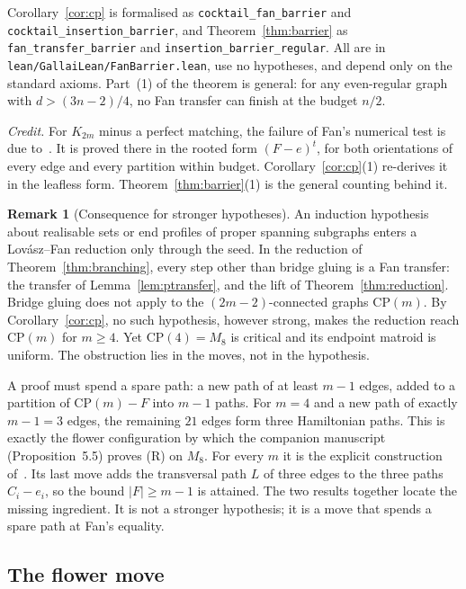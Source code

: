 \documentclass[11pt]{amsart}
\theoremstyle{definition}
\newtheorem{remark}[theorem]{Remark}
\begin{document}
{\sloppy Corollary~\ref{cor:cp} is formalised as \texttt{cocktail\_fan\_barrier} and
\texttt{cocktail\_insertion\_barrier}, and Theorem~\ref{thm:barrier} as \texttt{fan\_transfer\_barrier} and
\texttt{insertion\_barrier\_regular}. All are in \texttt{lean/GallaiLean/FanBarrier.lean}, use no
hypotheses, and depend only on the standard axioms. Part~(1) of the theorem is general: for any
even-regular graph with $d>(3n-2)/4$, no Fan transfer can finish at the budget $n/2$.\par}

\emph{Credit.} For $K_{2m}$ minus a perfect matching, the failure of Fan's numerical test is due
to~\cite[Theorem~10.21]{SP}. It is proved there in the rooted form $(F-e)^t$, for both orientations
of every edge and every partition within budget. Corollary~\ref{cor:cp}(1) re-derives it in the
leafless form. Theorem~\ref{thm:barrier}(1) is the general counting behind it.

\begin{remark}[Consequence for stronger hypotheses]\label{rem:Hverdict}
An induction hypothesis about realisable sets or end profiles of proper spanning subgraphs enters a
Lov\'asz--Fan reduction only through the seed. In the reduction of Theorem~\ref{thm:branching}, every
step other than bridge gluing is a Fan transfer: the transfer of Lemma~\ref{lem:ptransfer}, and the lift
of Theorem~\ref{thm:reduction}. Bridge gluing does not apply to the $(2m-2)$-connected graphs
$\mathrm{CP}(m)$. By Corollary~\ref{cor:cp}, no such hypothesis, however strong, makes the reduction
reach $\mathrm{CP}(m)$ for $m\ge4$. Yet $\mathrm{CP}(4)=M_8$ is critical and its endpoint matroid is
uniform. The obstruction lies in the moves, not in the hypothesis.

A proof must spend a spare path: a new path of at least $m-1$ edges, added to a partition of
$\mathrm{CP}(m)-F$ into $m-1$ paths. For $m=4$ and a new path of exactly $m-1=3$ edges, the remaining $21$
edges form three Hamiltonian paths. This is exactly the flower configuration by which the companion manuscript~\cite{MM}
(Proposition~5.5) proves (R) on $M_8$. For every $m$ it is the explicit construction
of~\cite[Theorem~10.21]{SP}. Its last move adds the transversal path $L$ of three edges to
the three paths $C_i-e_i$, so the bound $|F|\ge m-1$ is attained. The two results together locate the
missing ingredient. It is not a stronger hypothesis; it is a move that spends a spare path at
Fan's equality.
\end{remark}

\subsection*{The flower move}
\end{document}
